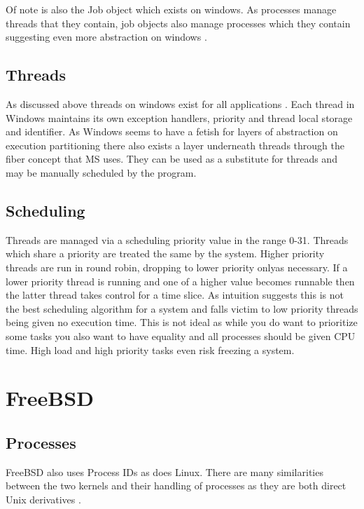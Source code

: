 \documentclass[letterpaper,10pt,notitlepage,fleqn]{article}
\begin{document}
Of note is also the Job object which exists on windows. As processes manage threads that 
they contain, job objects also manage processes which they contain suggesting even more 
abstraction on windows \cite{MSAbout}. 

\subsection{Threads}

As discussed above threads on windows exist for all applications \cite{MSAbout}. 
Each thread in Windows maintains its own exception handlers, priority and thread local
storage and identifier. As Windows seems to have a fetish for layers of abstraction on execution
partitioning there also exists a layer underneath threads through the fiber concept that MS 
uses. They can be used as a substitute for threads and may be manually scheduled by the program. 


\subsection{Scheduling}

Threads are managed via a scheduling priority value in the range 0-31. Threads 
which share a priority are treated the same by the system. Higher priority threads 
are run in round robin, dropping to lower priority onlyas necessary. If a 
lower priority thread is running and one of a higher value becomes runnable 
then the latter thread takes control for a time slice. \cite{MSScheduling} 
As intuition suggests this is not the best scheduling algorithm for a system and falls 
victim to low priority threads being given no execution time. This is not ideal as while you 
do want to prioritize some tasks you also want to have equality and all processes should be
given CPU time. High load and high priority tasks even risk freezing a system. 



\section{FreeBSD}

\subsection{Processes}

FreeBSD also uses Process IDs as does Linux. There are many similarities between the two 
kernels and their handling of processes as they are both direct Unix derivatives \cite{BSDPgen}.
\end{document}

